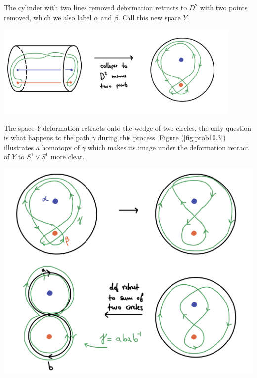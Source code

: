 \begin{homework}[e]
\begin{prf}
\begin{center}
      \label{fig:prob10.1}
    \end{center}
    The cylinder with two lines removed deformation retracts to $D^2$ with two points removed, which we also label $\alpha$ and $\beta$. Call this new space $Y$.
    \begin{center}
      \includegraphics[width=12cm]{figures/hwk4-fig2.jpg}
      \label{fig:prob10.2}
    \end{center}
    The space $Y$ deformation retracts onto the wedge of two circles, the only question is what happens to the path $\gamma$ during this process. Figure (\ref{fig:prob10.3}) illustrates a homotopy of $\gamma$ which makes its image under the deformation retract of $Y$ to $S^1\vee S^1$ more clear.
    \begin{center}
      \includegraphics[width=14cm]{figures/hwk4-fig3.jpg}
      \label{fig:prob10.3}
    \end{center}

\end{prf}
\end{homework}
